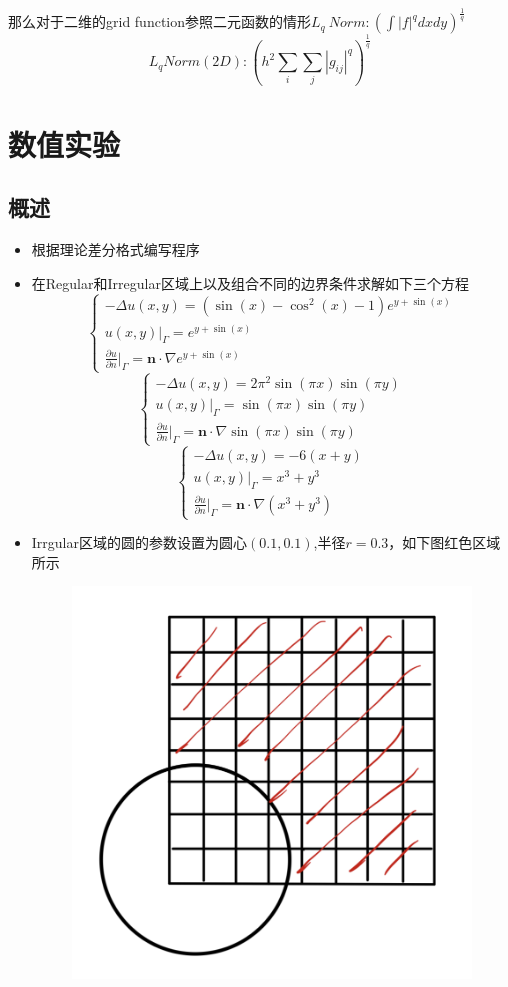 \documentclass{article}
\begin{document}
那么对于二维的grid function参照二元函数的情形$L_q\ Norm:\left( \int |f|^qdxdy\right)^{\frac{1}{q}}$
$$L_q Norm(2D):\left( h^2\sum_i \sum_j |g_{ij}|^q \right)^{\frac{1}{q}}$$
\section{数值实验}
\subsection{概述}
\begin{itemize}
    \item 根据理论差分格式编写程序
    \item 在Regular和Irregular区域上以及组合不同的边界条件求解如下三个方程
    $$
    \begin{cases}
        -\Delta u(x,y) = (\sin(x)-\cos^2(x)-1)e^{y+\sin(x)} \\
        u(x,y)|_{\Gamma} = e^{y+\sin(x)}\\
        \frac{\partial u}{\partial n}|_{\Gamma} = \mathbf{n}\cdot \nabla e^{y+\sin(x)} 
    \end{cases}
    $$
    $$
    \begin{cases}
        -\Delta u(x,y) = 2\pi^2\sin(\pi x)\sin(\pi y) \\
        u(x,y)|_{\Gamma} = \sin(\pi x)\sin(\pi y)\\
        \frac{\partial u}{\partial n}|_{\Gamma} = \mathbf{n}\cdot \nabla \sin(\pi x)\sin(\pi y) 
    \end{cases}
    $$
    $$
    \begin{cases}
        -\Delta u(x,y) = -6(x+y) \\
        u(x,y)|_{\Gamma} = x^3+y^3\\
        \frac{\partial u}{\partial n}|_{\Gamma} = \mathbf{n}\cdot \nabla (x^3+y^3) 
    \end{cases}
    $$
    \item Irrgular区域的圆的参数设置为圆心$(0.1,0.1)$,半径$r=0.3$，如下图红色区域所示
    \begin{figure}[h]
        \centering
        \includegraphics[width=0.5\linewidth]{irregularDomain.jpg}

\end{figure}
\end{itemize}
\end{document}
